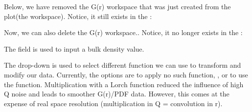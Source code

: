 Below, we have removed the G(r) workspace that was just created from the plot(the  workspace). Notice, it still exists in the :

\noindent{}

Now, we can also delete the G(r) workspace.. Notice, it no longer exists in the :

\noindent{}

The  field is used to input a bulk density value.

The  drop-down is used to select different function we can use to transform and modify our data. Currently, the options are to apply no such function,  , or to use the  function. Multiplication with a Lorch function reduced the influence of high Q noise and leads to smoother G(r)/PDF data. However, this comes at the expense of real space resolution (multiplication in Q = convolution in r).

